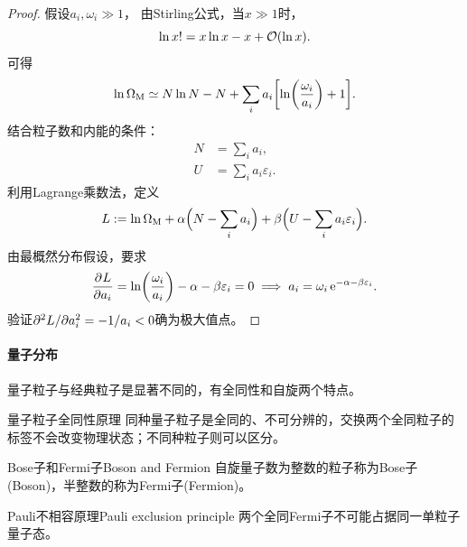 \begin{proof}
	假设$a_i,\omega_i \gg 1$，
	由Stirling公式，当$x \gg 1$时，
	\begin{equation}
		\ln x! = x\ln x - x + \mathcal{O}(\ln x).
	\end{equation}
	可得
	\[
		\ln\Omega_{\mathrm{M}} \simeq N\ln N - N + \sum_i a_i\biggl[\ln\biggl(\frac{\omega_i}{a_i}\biggr) + 1\biggr].
	\]
	结合粒子数和内能的条件：
	\begin{subequations}
		\begin{align}
			N &= \sum_i a_i,\\
			\label{eqn:U=sum a epsilon}
			U &= \sum_i a_i\varepsilon_i.
		\end{align}
	\end{subequations}
	利用Lagrange乘数法，定义
	\[
		L := \ln\Omega_{\mathrm{M}} + \alpha\Bigl(N - \sum_i a_i\Bigr) + \beta\Bigl(U - \sum_i a_i\varepsilon_i\Bigr).
	\]
	由最概然分布假设，要求
	\[
		\frac{\partial^{}L}{\partial{a_i}^{}} = \ln\biggl(\frac{\omega_i}{a_i}\biggr) - \alpha - \beta\varepsilon_i = 0
		\implies
		a_i = \omega_i\mathop{}\!\mathrm{e}^{-\alpha-\beta\varepsilon_i}.
	\]
	验证$\partial^2L/\partial a_i^2 = -1/a_i < 0$确为极大值点。
\end{proof}

\paragraph{量子分布}

量子粒子与经典粒子是显著不同的，有全同性和自旋两个特点。

\begin{theorem}
	{量子粒子全同性原理}{}
	同种量子粒子是全同的、不可分辨的，交换两个全同粒子的标签不会改变物理状态；不同种粒子则可以区分。
\end{theorem}

\begin{definition}
	{Bose子和Fermi子}{Boson and Fermion}
	自旋量子数为整数的粒子称为Bose子(Boson)，半整数的称为Fermi子(Fermion)。
\end{definition}

\begin{theorem}
	{Pauli不相容原理}{Pauli exclusion principle}
	两个全同Fermi子不可能占据同一单粒子量子态。
\end{theorem}

